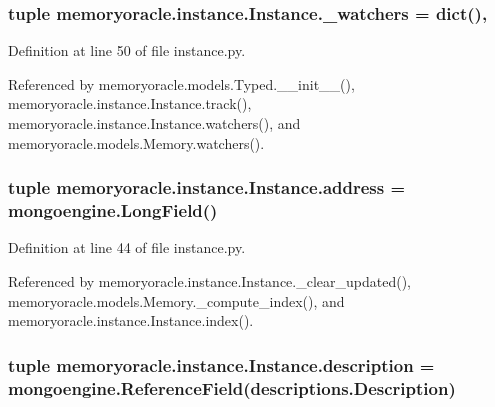 \subsubsection[{\+\_\+watchers}]{\setlength{\rightskip}{0pt plus 5cm}tuple memoryoracle.\+instance.\+Instance.\+\_\+watchers = dict()\hspace{0.3cm}{\ttfamily [static]}, {\ttfamily [private]}}\label{classmemoryoracle_1_1instance_1_1Instance_a8a701dbed8c8c14d7e59e94d78a559c0}


Definition at line 50 of file instance.\+py.



Referenced by memoryoracle.\+models.\+Typed.\+\_\+\+\_\+init\+\_\+\+\_\+(), memoryoracle.\+instance.\+Instance.\+track(), memoryoracle.\+instance.\+Instance.\+watchers(), and memoryoracle.\+models.\+Memory.\+watchers().

\hypertarget{classmemoryoracle_1_1instance_1_1Instance_a5fedf12b86436e597740001805187265}{}
\subsubsection[{address}]{\setlength{\rightskip}{0pt plus 5cm}tuple memoryoracle.\+instance.\+Instance.\+address = mongoengine.\+Long\+Field()\hspace{0.3cm}{\ttfamily [static]}}\label{classmemoryoracle_1_1instance_1_1Instance_a5fedf12b86436e597740001805187265}


Definition at line 44 of file instance.\+py.



Referenced by memoryoracle.\+instance.\+Instance.\+\_\+clear\+\_\+updated(), memoryoracle.\+models.\+Memory.\+\_\+compute\+\_\+index(), and memoryoracle.\+instance.\+Instance.\+index().

\hypertarget{classmemoryoracle_1_1instance_1_1Instance_a3aa42ba898da1ab4e26f2b345cb22344}{}
\subsubsection[{description}]{\setlength{\rightskip}{0pt plus 5cm}tuple memoryoracle.\+instance.\+Instance.\+description = mongoengine.\+Reference\+Field({\bf descriptions.\+Description})\hspace{0.3cm}{\ttfamily [static]}}\label{classmemoryoracle_1_1instance_1_1Instance_a3aa42ba898da1ab4e26f2b345cb22344}


